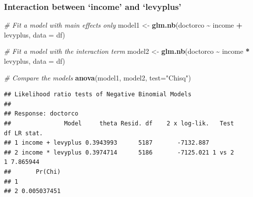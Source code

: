 \documentclass[
]{article}
\newenvironment{Shaded}{\begin{snugshade}}{\end{snugshade}}
\newcommand{\AttributeTok}[1]{\textcolor[rgb]{0.13,0.29,0.53}{#1}}
\newcommand{\CommentTok}[1]{\textcolor[rgb]{0.56,0.35,0.01}{\textit{#1}}}
\newcommand{\FunctionTok}[1]{\textcolor[rgb]{0.13,0.29,0.53}{\textbf{#1}}}
\newcommand{\NormalTok}[1]{#1}
\newcommand{\OtherTok}[1]{\textcolor[rgb]{0.56,0.35,0.01}{#1}}
\newcommand{\SpecialCharTok}[1]{\textcolor[rgb]{0.81,0.36,0.00}{\textbf{#1}}}
\newcommand{\StringTok}[1]{\textcolor[rgb]{0.31,0.60,0.02}{#1}}
\begin{document}
\subsubsection{Interaction between `income' and
`levyplus'}\label{interaction-between-income-and-levyplus}

\begin{Shaded}
\begin{Highlighting}[]
\CommentTok{\# Fit a model with main effects only}
\NormalTok{model1 }\OtherTok{\textless{}{-}} \FunctionTok{glm.nb}\NormalTok{(doctorco }\SpecialCharTok{\textasciitilde{}}\NormalTok{ income }\SpecialCharTok{+}\NormalTok{ levyplus, }\AttributeTok{data =}\NormalTok{ df)}

\CommentTok{\# Fit a model with the interaction term}
\NormalTok{model2 }\OtherTok{\textless{}{-}} \FunctionTok{glm.nb}\NormalTok{(doctorco }\SpecialCharTok{\textasciitilde{}}\NormalTok{ income }\SpecialCharTok{*}\NormalTok{ levyplus, }\AttributeTok{data =}\NormalTok{ df)}

\CommentTok{\# Compare the models}
\FunctionTok{anova}\NormalTok{(model1, model2, }\AttributeTok{test=}\StringTok{"Chisq"}\NormalTok{)}
\end{Highlighting}
\end{Shaded}

\begin{verbatim}
## Likelihood ratio tests of Negative Binomial Models
## 
## Response: doctorco
##               Model     theta Resid. df    2 x log-lik.   Test    df LR stat.
## 1 income + levyplus 0.3943993      5187       -7132.887                      
## 2 income * levyplus 0.3974714      5186       -7125.021 1 vs 2     1 7.865944
##       Pr(Chi)
## 1            
## 2 0.005037451
\end{verbatim}
\end{document}
